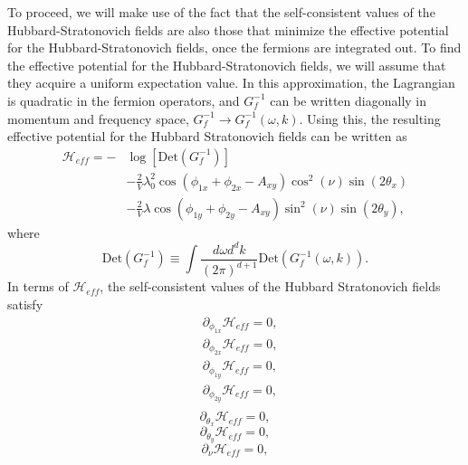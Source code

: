 \documentclass[prb,aps,twocolumn,groupaddress,floatfix]{revtex4-1}
\begin{document}
To proceed, we will make use of the fact that the self-consistent values of the Hubbard-Stratonovich fields are also those that minimize the effective potential for the Hubbard-Stratonovich fields, once the fermions are integrated out. To find the effective potential for the Hubbard-Stratonovich fields, we will assume that they acquire a uniform expectation value. In this approximation, the Lagrangian is quadratic in the fermion operators,
and $G^{-1}_f$ can be written diagonally in momentum and frequency space, $G^{-1}_f \rightarrow G^{-1}_f(\omega, k)$. Using this, the resulting effective potential for the Hubbard Stratonovich fields can be written as
\begin{equation}
\begin{split}
\mathcal{H}_{eff} = -&\log[\text{Det}( G_f^{-1} )]\\ & - \frac{2}{V} \lambda^2_0 \cos(\phi_{1x} + \phi_{2x}- A_{xy})\cos^2(\nu)\sin(2\theta_x)\\&  - \frac{2}{V}\lambda \cos(\phi_{1y} + \phi_{2y}- A_{xy})\sin^2(\nu)\sin(2\theta_y),
\end{split}
\end{equation}
where 
\begin{equation}
\text{Det}( G_f^{-1} ) \equiv \int \frac{d\omega d^d k}{(2\pi)^{d+1}} \text{Det}(G_f^{-1}(\omega,k)).
\end{equation}
In terms of $\mathcal{H}_{eff}$, the self-consistent values of the Hubbard Stratonovich fields satisfy
\begin{equation}
\begin{split}
&\partial_{\phi_{1x}}  \mathcal{H}_{eff} = 0,\\
&\partial_{\phi_{2x}}  \mathcal{H}_{eff} = 0,\\
&\partial_{\phi_{1y}}  \mathcal{H}_{eff} = 0,\\
&\partial_{\phi_{2y}}  \mathcal{H}_{eff} = 0,\\
\end{split}\label{Aeq:SCEq1}
\end{equation}
\begin{equation}
\partial_{\theta_x} \mathcal{H}_{eff} = 0,\label{Aeq:SCEq2}
\end{equation}
\begin{equation}
\partial_{\theta_y} \mathcal{H}_{eff} = 0,\label{Aeq:SCEq3}
\end{equation}
\begin{equation}
\partial_\nu \mathcal{H}_{eff} = 0,\label{Aeq:SCEq4}
\end{equation}
\end{document}
